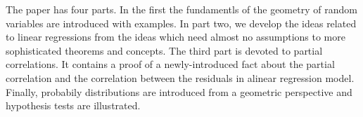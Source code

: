 \begin{fullwidth}
The paper has four parts. In the first the fundamentls of the geometry
of random variables are introduced with examples.
In part two, we develop the ideas related to linear regressions
from the ideas which need almost no assumptions to more sophisticated theorems
and concepts.
The third part is devoted to partial correlations. It contains a proof of
a newly-introduced fact about the partial correlation and the correlation
between the residuals in  alinear regression model.
Finally, probabily distributions are introduced from a geometric perspective
and hypothesis tests are illustrated.

\end{fullwidth}
